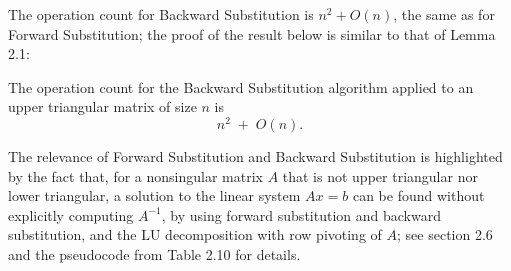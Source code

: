 The operation count for Backward Substitution is $n^2 + O(n)$, the same
as for Forward Substitution; the proof of the result below is similar to
that of Lemma 2.1:

\begin{lemma}
The operation count for the Backward Substitution algorithm applied to
an upper triangular matrix of size $n$ is
\begin{equation}
n^2 \;+\; O(n).
\end{equation}
\end{lemma}

\begin{table}[H]
\centering
\caption{Pseudocode for Backward Substitution}
\end{table}

The relevance of Forward Substitution and Backward Substitution is
highlighted by the fact that, for a nonsingular matrix $A$ that is not
upper triangular nor lower triangular, a solution to the linear system
$Ax = b$ can be found without explicitly computing $A^{-1}$, by using
forward substitution and backward substitution, and the LU decomposition
with row pivoting of $A$; see section 2.6 and the pseudocode from
Table 2.10 for details.

